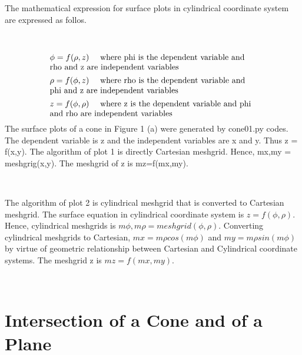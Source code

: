 \documentclass[10pt,a4paper,leqno]{article}
\begin{document}
\begin{CJK*}{UTF8}{gbsn}
\noindent The mathematical expression for surface plots in cylindrical coordinate system are expressed as follos.
 \par \ \par\begin{equation}
 \begin{minipage}{250pt}
                \begin{flushleft} $\displaystyle \phi = f{\left(\rho,z \right)}$  \quad where phi is the dependent variable and rho and z are independent variables \end{flushleft}
 \end{minipage}
 \end{equation}
\begin{equation}
 \begin{minipage}{250pt}
                \begin{flushleft} $\displaystyle \rho = f{\left(\phi,z \right)}$  \quad where rho is the dependent variable and phi and z are independent variables \end{flushleft}
 \end{minipage}
 \end{equation}
\begin{equation}
 \begin{minipage}{250pt}
                \begin{flushleft} $\displaystyle z = f{\left(\phi,\rho \right)}$  \quad where z is the dependent variable and phi and rho are independent variables \end{flushleft}
 \end{minipage}
 \end{equation}
\noindent The surface plots of a cone in Figure 1 (a)  were generated by cone01.py codes. The dependent variable is z and the independent variables are x and y. Thus z = f(x,y). The algorithm of plot 1 is directly Cartesian meshgrid. Hence, mx,my = meshgrig(x,y). The meshgrid of z is mz=f(mx,my). 
 \par \ \par\noindent The algorithm of plot 2 is cylindrical meshgrid that is converted to Cartesian meshgrid. The surface equation in cylindrical coordinate system is $z = f{\left(\phi,\rho \right)}$.  Hence, cylindrical meshgrids is $m\phi,m\rho = meshgrid(\phi,\rho)$. Converting cylindrical meshgrids to Cartesian, $mx = m\rho cos(m\phi)$ and $my = m\rho sin(m\phi)$ by virtue of geometric relationship between Cartesian and Cylindrical coordinate systems. The meshgrid z is $mz=f(mx,my)$.
 \par \ \par\noindent \section{Intersection of a Cone and of a Plane }

\end{CJK*}
\end{document}
